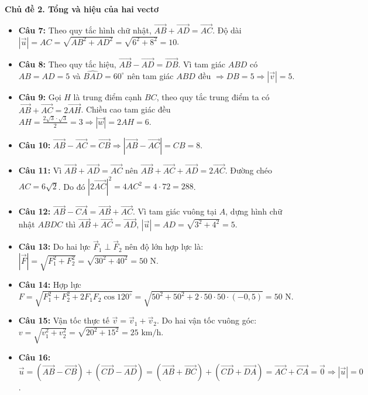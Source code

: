 \documentclass[12pt,a4paper]{article}
\begin{document}
\newpage

\noindent\textbf{\large Chủ đề 2. Tổng và hiệu của hai vectơ}
\begin{itemize}[leftmargin=1.5em, itemsep=2.5pt]
    \item \textbf{Câu 7:} Theo quy tắc hình chữ nhật, $\vec{AB} + \vec{AD} = \vec{AC}$. Độ dài $|\vec{u}| = AC = \sqrt{AB^2 + AD^2} = \sqrt{6^2 + 8^2} = 10$.
    \item \textbf{Câu 8:} Theo quy tắc hiệu, $\vec{AB} - \vec{AD} = \vec{DB}$. Vì tam giác $ABD$ có $AB = AD = 5$ và $\widehat{BAD} = 60^\circ$ nên tam giác $ABD$ đều $\Rightarrow DB = 5 \Rightarrow |\vec{v}| = 5$.
    \item \textbf{Câu 9:} Gọi $H$ là trung điểm cạnh $BC$, theo quy tắc trung điểm ta có $\vec{AB} + \vec{AC} = 2\vec{AH}$. Chiều cao tam giác đều $AH = \frac{2\sqrt{3} \cdot \sqrt{3}}{2} = 3 \Rightarrow |\vec{w}| = 2 AH = 6$.
    \item \textbf{Câu 10:} $\vec{AB} - \vec{AC} = \vec{CB} \Rightarrow |\vec{AB} - \vec{AC}| = CB = 8$.
    \item \textbf{Câu 11:} Vì $\vec{AB} + \vec{AD} = \vec{AC}$ nên $\vec{AB} + \vec{AC} + \vec{AD} = 2\vec{AC}$. Đường chéo $AC = 6\sqrt{2}$. Do đó $|2\vec{AC}|^2 = 4 AC^2 = 4 \cdot 72 = 288$.
    \item \textbf{Câu 12:} $\vec{AB} - \vec{CA} = \vec{AB} + \vec{AC}$. Vì tam giác vuông tại $A$, dựng hình chữ nhật $ABDC$ thì $\vec{AB} + \vec{AC} = \vec{AD}$, $|\vec{u}| = AD = \sqrt{3^2 + 4^2} = 5$.
    \item \textbf{Câu 13:} Do hai lực $\vec{F}_1 \perp \vec{F}_2$ nên độ lớn hợp lực là: $|\vec{F}| = \sqrt{F_1^2 + F_2^2} = \sqrt{30^2 + 40^2} = 50\text{ N}$.
    \item \textbf{Câu 14:} Hợp lực $F = \sqrt{F_1^2 + F_2^2 + 2F_1 F_2 \cos 120^\circ} = \sqrt{50^2 + 50^2 + 2 \cdot 50 \cdot 50 \cdot (-0{,}5)} = 50\text{ N}$.
    \item \textbf{Câu 15:} Vận tốc thực tế $\vec{v} = \vec{v}_1 + \vec{v}_2$. Do hai vận tốc vuông góc: $v = \sqrt{v_1^2 + v_2^2} = \sqrt{20^2 + 15^2} = 25\text{ km/h}$.
    \item \textbf{Câu 16:} $\vec{u} = (\vec{AB} - \vec{CB}) + (\vec{CD} - \vec{AD}) = (\vec{AB} + \vec{BC}) + (\vec{CD} + \vec{DA}) = \vec{AC} + \vec{CA} = \vec{0} \Rightarrow |\vec{u}| = 0$.
\end{itemize}
\end{document}
